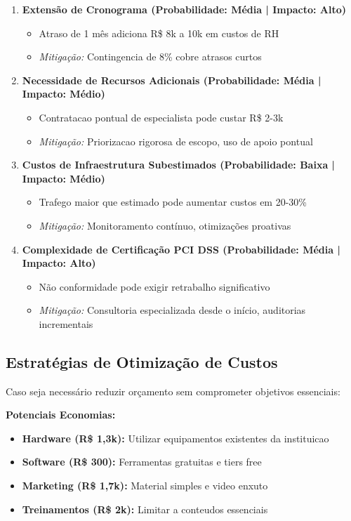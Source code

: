 \begin{enumerate}
    \item \textbf{Extensão de Cronograma (Probabilidade: Média | Impacto: Alto)}
    \begin{itemize}
        \item Atraso de 1 mês adiciona R\$ 8k a 10k em custos de RH
        \item \textit{Mitigação:} Contingencia de 8\% cobre atrasos curtos
    \end{itemize}

    \item \textbf{Necessidade de Recursos Adicionais (Probabilidade: Média | Impacto: Médio)}
    \begin{itemize}
        \item Contratacao pontual de especialista pode custar R\$ 2-3k
        \item \textit{Mitigação:} Priorizacao rigorosa de escopo, uso de apoio pontual
    \end{itemize}

    \item \textbf{Custos de Infraestrutura Subestimados (Probabilidade: Baixa | Impacto: Médio)}
    \begin{itemize}
        \item Trafego maior que estimado pode aumentar custos em 20-30\%
        \item \textit{Mitigação:} Monitoramento contínuo, otimizações proativas
    \end{itemize}

    \item \textbf{Complexidade de Certificação PCI DSS (Probabilidade: Média | Impacto: Alto)}
    \begin{itemize}
        \item Não conformidade pode exigir retrabalho significativo
        \item \textit{Mitigação:} Consultoria especializada desde o início, auditorias incrementais
    \end{itemize}
\end{enumerate}

\subsection{Estratégias de Otimização de Custos}

Caso seja necessário reduzir orçamento sem comprometer objetivos essenciais:

\textbf{Potenciais Economias:}
\begin{itemize}
    \item \textbf{Hardware (R\$ 1,3k):} Utilizar equipamentos existentes da instituicao
    \item \textbf{Software (R\$ 300):} Ferramentas gratuitas e tiers free
    \item \textbf{Marketing (R\$ 1,7k):} Material simples e video enxuto
    \item \textbf{Treinamentos (R\$ 2k):} Limitar a conteudos essenciais
\end{itemize}


